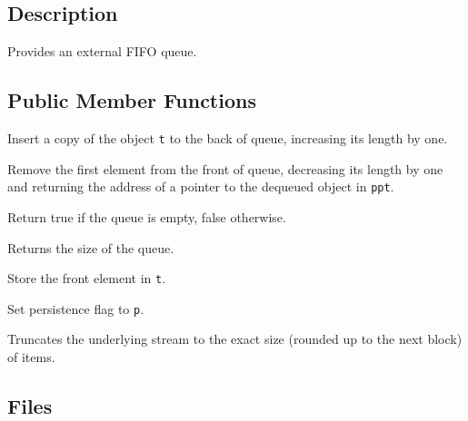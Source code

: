 \subsection{Description}
Provides an external FIFO queue. 

\subsection{Public Member Functions}
   \btabb 
   
    {Insert a copy of the
     object \lstinline|t| to the back of queue, increasing its
     length by one.}
   
    {Remove the first element
     from the front of queue, decreasing its length by one and returning
     the address of a pointer to the dequeued object in \lstinline|ppt|.}

    {Return true if the queue is empty, 
      false otherwise.}

    {Returns the size of the 
      queue.}

    {Store the front element 
      in \lstinline|t|.}

    {Set persistence flag 
      to \lstinline|p|.}

    {Truncates the underlying stream to 
      the exact size (rounded up to the next block) of items.}

   \etabb




\clearpage

\tobewritten


\clearpage

\tobewritten




\clearpage

\subsection{Files}
  \btabb
         {}
  \etabb


